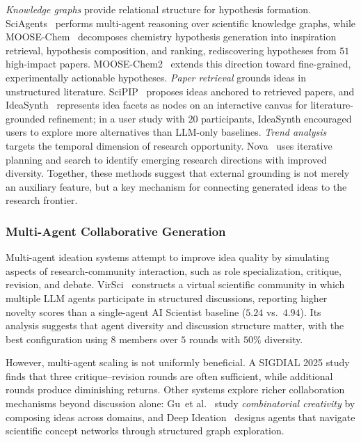 \documentclass{llmxive}
\providecommand{\etal}{et al.\xspace}
\begin{document}
\emph{Knowledge graphs} provide relational structure for hypothesis formation. SciAgents~\cite{ghafarollahi2024sciagents} performs multi-agent reasoning over scientific knowledge graphs, while MOOSE-Chem~\cite{yang2024moosechem} decomposes chemistry hypothesis generation into inspiration retrieval, hypothesis composition, and ranking, rediscovering hypotheses from $51$ high-impact papers. MOOSE-Chem2~\cite{yang2025moosechem2} extends this direction toward fine-grained, experimentally actionable hypotheses. \emph{Paper retrieval} grounds ideas in unstructured literature. SciPIP~\cite{wang2024scipip} proposes ideas anchored to retrieved papers, and IdeaSynth~\cite{pu2025ideasynth} represents idea facets as nodes on an interactive canvas for literature-grounded refinement; in a user study with $20$ participants, IdeaSynth encouraged users to explore more alternatives than LLM-only baselines. \emph{Trend analysis} targets the temporal dimension of research opportunity. Nova~\cite{hu2024nova} uses iterative planning and search to identify emerging research directions with improved diversity. Together, these methods suggest that external grounding is not merely an auxiliary feature, but a key mechanism for connecting generated ideas to the research frontier.


\subsubsection{Multi-Agent Collaborative Generation}
\label{sec:idea_multiagent}

Multi-agent ideation systems attempt to improve idea quality by simulating aspects of research-community interaction, such as role specialization, critique, revision, and debate. VirSci~\cite{su2024virsci} constructs a virtual scientific community in which multiple LLM agents participate in structured discussions, reporting higher novelty scores than a single-agent AI Scientist baseline ($5.24$ vs.\ $4.94$). Its analysis suggests that agent diversity and discussion structure matter, with the best configuration using $8$ members over $5$ rounds with $50\%$ diversity.

However, multi-agent scaling is not uniformly beneficial. A SIGDIAL 2025 study~\cite{sigdial2025multiagent} finds that three critique--revision rounds are often sufficient, while additional rounds produce diminishing returns. Other systems explore richer collaboration mechanisms beyond discussion alone: Gu~\etal~\cite{gu2024combinatorial} study \emph{combinatorial creativity} by composing ideas across domains, and Deep Ideation~\cite{zhao2025deepideation} designs agents that navigate scientific concept networks through structured graph exploration. 
\end{document}
